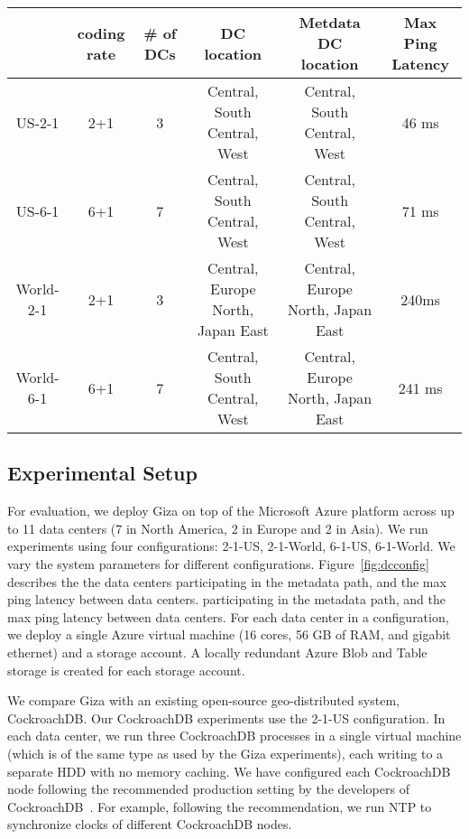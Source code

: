 \begin{figure*}
\begin{tabular}{c|c|c|c|c|c}
& coding rate & \# of DCs & DC location & Metdata DC location & Max Ping Latency\\
\hline
US-2-1 & 2+1 & 3 & Central, South Central, West & Central, South Central, West & 46 ms \\
US-6-1 & 6+1 & 7 & Central, South Central, West & Central, South Central, West & 71 ms\\ 
World-2-1 & 2+1 & 3 & Central, Europe North, Japan East & Central, Europe North, Japan East & 240ms\\
World-6-1 & 6+1 & 7 & Central, South Central, West & Central, Europe North, Japan East & 241 ms\\
\end{tabular}
\caption{The DC configurations and inter-DC latencies in various experiments~\label{fig:dcconfig}} 
\end{figure*}

\subsection{Experimental Setup}
For evaluation, we deploy Giza on top of the Microsoft Azure platform across up to 11 data centers (7 in North America, 2 in Europe and 2 in Asia). %
We run experiments using four configurations: 2-1-US, 2-1-World, 6-1-US, 6-1-World.  We vary the system parameters for different configurations. Figure~\ref{fig:dcconfig} describes the the data centers participating in the metadata path, and the max ping latency between data centers. 
 participating in the metadata path, and the max ping latency between data centers. For each data center in a configuration, we deploy a single Azure virtual machine (16 cores, 56 GB of RAM, and gigabit ethernet) and a storage account. A locally redundant Azure Blob and Table storage is created for each storage account.

 We compare Giza with an existing open-source geo-distributed system, CockroachDB.  Our CockroachDB experiments use the 2-1-US configuration. In each data center, we run three CockroachDB processes in a single virtual machine (which is of the same type as used by the Giza experiments), each writing to a separate HDD with no memory caching. We have configured each CockroachDB node following the recommended production setting by the developers of CockroachDB~\cite{XXX}. For example, following the recommendation, we run NTP to synchronize clocks of different CockroachDB nodes.

